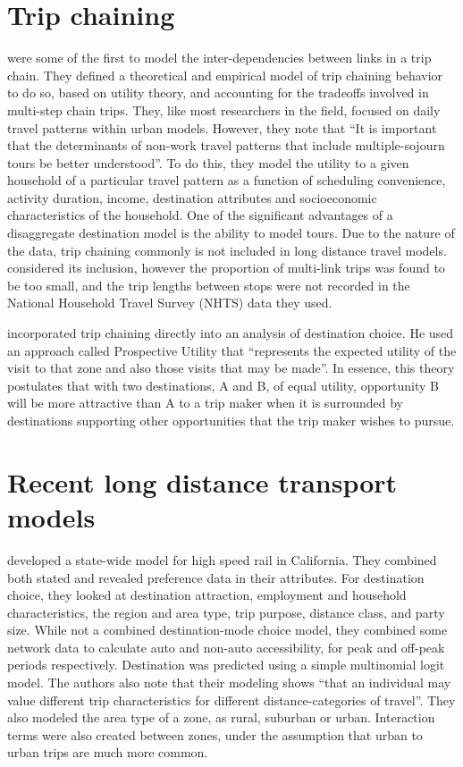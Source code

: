 \section{Trip chaining}
\textcite{AdlerAkiva79} were some of the first to model the inter-dependencies between links in a trip chain. They defined a theoretical and empirical model of trip chaining behavior to do so, based on utility theory, and accounting for the tradeoffs involved in multi-step chain trips. They, like most researchers in the field, focused on daily travel patterns within urban models. However, they note that \enquote{It is important that the determinants of non-work travel patterns that include multiple-sojourn tours be better understood}. To do this, they model the utility to a given household of a particular travel pattern as a function of scheduling convenience, activity duration, income, destination attributes and socioeconomic characteristics of the household.
One of the significant advantages of a disaggregate destination model is the ability to model tours. Due to the nature of the data, trip chaining commonly is not included in long distance travel models. \textcite{Moeckel15} considered its inclusion, however the proportion of multi-link trips was found to be too small, and the trip lengths between stops were not recorded in the National Household Travel Survey (NHTS) data they used. 

\textcite{Kitamura84} incorporated trip chaining directly into an analysis of destination choice. He used an approach called Prospective Utility that \enquote{represents the expected utility of the visit to that zone and also those visits that may be made}. In essence, this theory postulates that with two destinations, A and B, of equal utility, opportunity B will be more attractive than A to a trip maker when it is surrounded by destinations supporting other opportunities that the trip maker wishes to pursue.

\section{Recent long distance transport models}
\textcite{Outwater10} developed a state-wide model for high speed rail in California. They combined both stated and revealed preference data in their attributes. For destination choice, they looked at destination attraction, employment and household characteristics, the region and area type, trip purpose, distance class, and party size. While not a combined destination-mode choice model, they combined some network data to calculate auto and non-auto accessibility, for peak and off-peak periods respectively. Destination was predicted using a simple multinomial logit model. The authors also note that their modeling shows \enquote{that an individual may value different trip characteristics for different distance-categories of travel}. They also modeled the area type of a zone, as rural, suburban or urban. Interaction terms were also created between zones, under the assumption that urban to urban trips are much more common.

